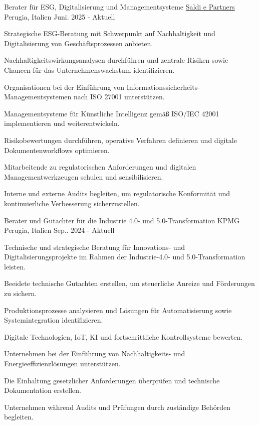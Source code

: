 
\begin{cventries}

\cventry
{Berater für ESG, Digitalisierung und Managementsysteme}
{\href{https://s-partners.it}{Saldi e Partners}}
{Perugia, Italien}
{Juni. 2025 - Aktuell}
{\begin{cvitems}
\item {Strategische ESG-Beratung mit Schwerpunkt auf Nachhaltigkeit und Digitalisierung von Geschäftsprozessen anbieten.}
\item {Nachhaltigkeitswirkungsanalysen durchführen und zentrale Risiken sowie Chancen für das Unternehmenswachstum identifizieren.}
\item {Organisationen bei der Einführung von Informationssicherheits-Managementsystemen nach ISO 27001 unterstützen.}
\item {Managementsysteme für Künstliche Intelligenz gemäß ISO/IEC 42001 implementieren und weiterentwickeln.}
\item {Risikobewertungen durchführen, operative Verfahren definieren und digitale Dokumentenworkflows optimieren.}
\item {Mitarbeitende zu regulatorischen Anforderungen und digitalen Managementwerkzeugen schulen und sensibilisieren.}
\item {Interne und externe Audits begleiten, um regulatorische Konformität und kontinuierliche Verbesserung sicherzustellen.}
\end{cvitems}}

\cventry
{Berater und Gutachter für die Industrie 4.0- und 5.0-Transformation}
{KPMG}
{Perugia, Italien}
{Sep.. 2024 - Aktuell}
{\begin{cvitems}
\item {Technische und strategische Beratung für Innovations- und Digitalisierungsprojekte im Rahmen der Industrie-4.0- und 5.0-Transformation leisten.}
\item {Beeidete technische Gutachten erstellen, um steuerliche Anreize und Förderungen zu sichern.}
\item {Produktionsprozesse analysieren und Lösungen für Automatisierung sowie Systemintegration identifizieren.}
\item {Digitale Technologien, IoT, KI und fortschrittliche Kontrollsysteme bewerten.}
\item {Unternehmen bei der Einführung von Nachhaltigkeits- und Energieeffizienzlösungen unterstützen.}
\item {Die Einhaltung gesetzlicher Anforderungen überprüfen und technische Dokumentation erstellen.}
\item {Unternehmen während Audits und Prüfungen durch zuständige Behörden begleiten.}
\end{cvitems}}


\end{cventries}
